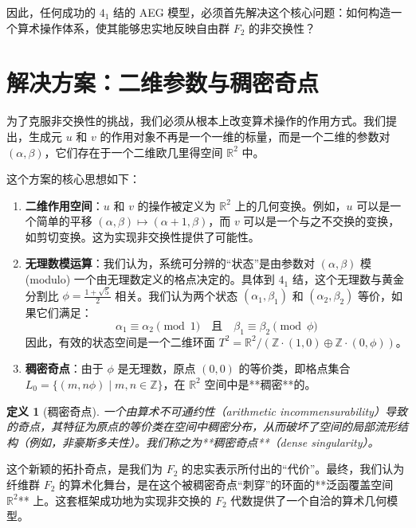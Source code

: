 \documentclass[a4paper,12pt]{book}
\numberwithin{problem}{section}
\newtheorem{definition}{定义}
\numberwithin{definition}{section}
\numberwithin{lemma}{section}
\numberwithin{proposition}{section}
\numberwithin{theorem}{section}
\numberwithin{grammar}{section}
\numberwithin{program}{section}
\numberwithin{convention}{section}
\numberwithin{corollary}{section}
\begin{document}
因此，任何成功的 $4_1$ 结的 AEG 模型，必须首先解决这个核心问题：如何构造一个算术操作体系，使其能够忠实地反映自由群 $F_2$ 的非交换性？

\section{解决方案：二维参数与稠密奇点}
\label{sec:e41_dense_singularity}

为了克服非交换性的挑战，我们必须从根本上改变算术操作的作用方式。我们提出，生成元 $u$ 和 $v$ 的作用对象不再是一个一维的标量，而是一个二维的参数对 $(\alpha, \beta)$，它们存在于一个二维欧几里得空间 $\mathbb{R}^2$ 中。

这个方案的核心思想如下：
\begin{enumerate}
    \item \textbf{二维作用空间}：$u$ 和 $v$ 的操作被定义为 $\mathbb{R}^2$ 上的几何变换。例如，$u$ 可以是一个简单的平移 $(\alpha, \beta) \mapsto (\alpha+1, \beta)$，而 $v$ 可以是一个与之不交换的变换，如剪切变换。这为实现非交换性提供了可能性。
    \item \textbf{无理数模运算}：我们认为，系统可分辨的“状态”是由参数对 $(\alpha, \beta)$ 模 (modulo) 一个由无理数定义的格点决定的。具体到 $4_1$ 结，这个无理数与黄金分割比 $\phi = \frac{1+\sqrt{5}}{2}$ 相关。我们认为两个状态 $(\alpha_1, \beta_1)$ 和 $(\alpha_2, \beta_2)$ 等价，如果它们满足：
    \[ \alpha_1 \equiv \alpha_2 \pmod 1 \quad \text{且} \quad \beta_1 \equiv \beta_2 \pmod \phi \]
    因此，有效的状态空间是一个二维环面 $T^2 = \mathbb{R}^2 / (\mathbb{Z}\cdot(1,0) \oplus \mathbb{Z}\cdot(0,\phi))$。
    \item \textbf{稠密奇点}：由于 $\phi$ 是无理数，原点 $(0,0)$ 的等价类，即格点集合 $L_0 = \{ (m, n\phi) \mid m,n \in \mathbb{Z} \}$，在 $\mathbb{R}^2$ 空间中是**稠密**的。
\end{enumerate}

\begin{definition}[稠密奇点]
    \label{def:dense_singularity}
    一个由算术不可通约性（arithmetic incommensurability）导致的奇点，其特征为原点的等价类在空间中稠密分布，从而破坏了空间的局部流形结构（例如，非豪斯多夫性）。我们称之为**稠密奇点**（dense singularity）。
\end{definition}

这个新颖的拓扑奇点，是我们为 $F_2$ 的忠实表示所付出的“代价”。最终，我们认为纤维群 $F_2$ 的算术化舞台，是在这个被稠密奇点“刺穿”的环面的**泛函覆盖空间 $\mathbb{R}^2$** 上。这套框架成功地为实现非交换的 $F_2$ 代数提供了一个自洽的算术几何模型。
\end{document}
